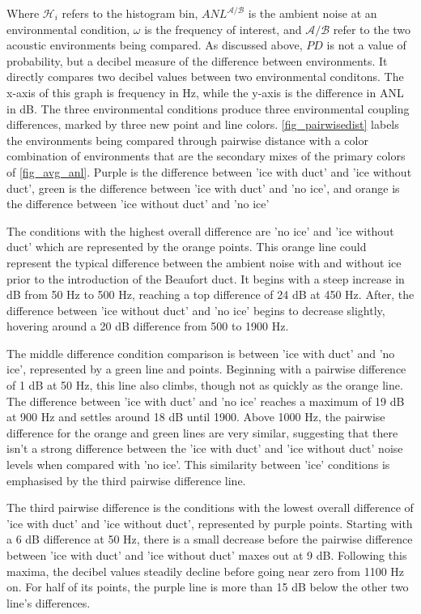 Where $\mathcal{H}_{i}$ refers to the histogram bin, $ANL^{\mathcal{A/B}}$ is the ambient noise at an environmental condition, $\omega$ is the frequency of interest, and $\mathcal{A/B}$ refer to the two acoustic environments being compared. As discussed above, $PD$ is not a value of probability, but a decibel measure of the difference between environments. It directly compares two decibel values between two environmental conditons. The x-axis of this graph is frequency in Hz, while the y-axis is the difference in ANL in dB. The three environmental conditions produce three environmental coupling differences, marked by three new point and line colors. \autoref{fig_pairwisedist} labels the environments being compared through pairwise distance with a color combination of environments that are the secondary mixes of the primary colors of \autoref{fig_avg_anl}. Purple is the difference between 'ice with duct' and 'ice without duct', green is the difference between 'ice with duct' and 'no ice', and orange is the difference between 'ice without duct' and 'no ice'


The conditions with the highest overall difference are 'no ice' and 'ice without duct' which are represented by the orange points. This orange line could represent the typical difference between the ambient noise with and without ice prior to the introduction of the Beaufort duct. It begins with a steep increase in dB from 50 Hz to 500 Hz, reaching a top difference of 24 dB at 450 Hz. After, the difference between 'ice without duct' and 'no ice' begins to decrease slightly, hovering around a 20 dB difference from 500 to 1900 Hz.

The middle difference condition comparison is between 'ice with duct' and 'no ice', represented by a green line and points. Beginning with a pairwise difference of 1 dB at 50 Hz, this line also climbs, though not as quickly as the orange line. The difference between 'ice with duct' and 'no ice' reaches a maximum of 19 dB at 900 Hz and settles around 18 dB until 1900. Above 1000 Hz, the pairwise difference for the orange and green lines are very similar, suggesting that there isn't a strong difference between the 'ice with duct' and 'ice without duct' noise levels when compared with 'no ice'. This  similarity between 'ice' conditions is emphasised by the third pairwise difference line.

The third pairwise difference is the conditions with the lowest overall difference of 'ice with duct' and 'ice without duct', represented by purple points. Starting with a 6 dB difference at 50 Hz, there is a small decrease before the pairwise difference between 'ice with duct' and 'ice without duct' maxes out at 9 dB. Following this maxima, the decibel values steadily decline before going near zero from 1100 Hz on. For half of its points, the purple line is more than 15 dB below the other two line's differences.  

